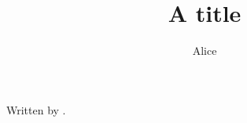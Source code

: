 \documentclass{article}
\title{A title}
\author{Alice}
\begin{document}
\maketitle
Written by \myauth.
\end{document}
